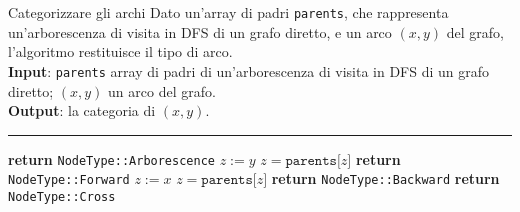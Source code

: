 \documentclass[a4paper, 12pt]{report}
\begin{document}
    \begin{framedalgo}{Categorizzare gli archi}
        Dato un'array di padri \texttt{parents}, che rappresenta un'arborescenza di visita in DFS di un grafo diretto, e un arco $(x, y)$ del grafo, l'algoritmo restituisce il tipo di arco.\\
        \textbf{Input}: \texttt{parents} array di padri di un'arborescenza di visita in DFS di un grafo diretto; $(x, y)$ un arco del grafo.\\
        \textbf{Output}: la categoria di $(x, y)$.

        \hrule
        \begin{algorithmic}[1]
                    \State \textbf{return} \texttt{NodeType::Arborescence}
                \EndIf
                \State $z := y$
                    \State $z = \texttt{parents[}z\texttt{]}$
                        \State \textbf{return} \texttt{NodeType::Forward}
                    \EndIf
                \EndWhile
                \State $z := x$
                    \State $z = \texttt{parents[}z\texttt{]}$
                        \State \textbf{return} \texttt{NodeType::Backward}
                    \EndIf
                \EndWhile
                \State \textbf{return} \texttt{NodeType::Cross}
            \EndFunction
        \end{algorithmic}
    \end{framedalgo}
\end{document}
